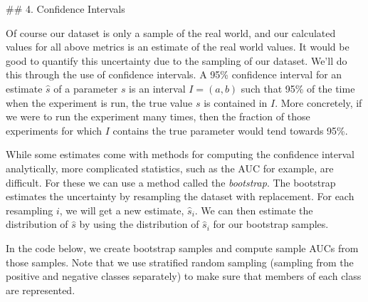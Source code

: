 \documentclass[11pt]{article}
\begin{document}
     \#\# 4. Confidence Intervals

    Of course our dataset is only a sample of the real world, and our
calculated values for all above metrics is an estimate of the real world
values. It would be good to quantify this uncertainty due to the
sampling of our dataset. We'll do this through the use of confidence
intervals. A 95\% confidence interval for an estimate \(\hat{s}\) of a
parameter \(s\) is an interval \(I = (a, b)\) such that 95\% of the time
when the experiment is run, the true value \(s\) is contained in \(I\).
More concretely, if we were to run the experiment many times, then the
fraction of those experiments for which \(I\) contains the true
parameter would tend towards 95\%.

While some estimates come with methods for computing the confidence
interval analytically, more complicated statistics, such as the AUC for
example, are difficult. For these we can use a method called the
\emph{bootstrap}. The bootstrap estimates the uncertainty by resampling
the dataset with replacement. For each resampling \(i\), we will get a
new estimate, \(\hat{s}_i\). We can then estimate the distribution of
\(\hat{s}\) by using the distribution of \(\hat{s}_i\) for our bootstrap
samples.

In the code below, we create bootstrap samples and compute sample AUCs
from those samples. Note that we use stratified random sampling
(sampling from the positive and negative classes separately) to make
sure that members of each class are represented.
\end{document}
